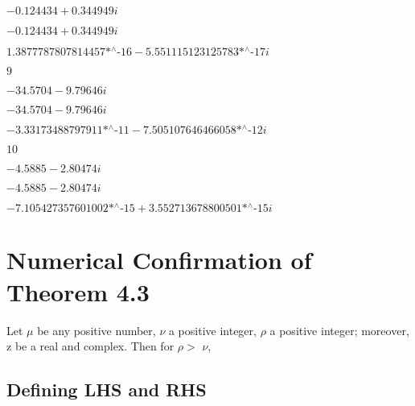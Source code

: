 \noindent\(-0.124434+0.344949 i\)

\noindent\(-0.124434+0.344949 i\)

\noindent\(\text{1.3877787807814457$\grave{ }$*${}^{\wedge}$-16}-\text{5.551115123125783$\grave{ }$*${}^{\wedge}$-17} i\)

\noindent\(9\)

\noindent\(-34.5704-9.79646 i\)

\noindent\(-34.5704-9.79646 i\)

\noindent\(-\text{3.33173488797911$\grave{ }$*${}^{\wedge}$-11}-\text{7.505107646466058$\grave{ }$*${}^{\wedge}$-12} i\)

\noindent\(10\)

\noindent\(-4.5885-2.80474 i\)

\noindent\(-4.5885-2.80474 i\)

\noindent\(-\text{7.105427357601002$\grave{ }$*${}^{\wedge}$-15}+\text{3.552713678800501$\grave{ }$*${}^{\wedge}$-15} i\)

\section*{Numerical Confirmation of Theorem 4.3}

Let $\mu $ be any positive number, $\nu $ a positive integer, $\rho $ a positive integer; moreover, z be a real and complex. Then for { }$\rho $$>$ $\nu $,
\subsection*{Defining LHS and RHS}

